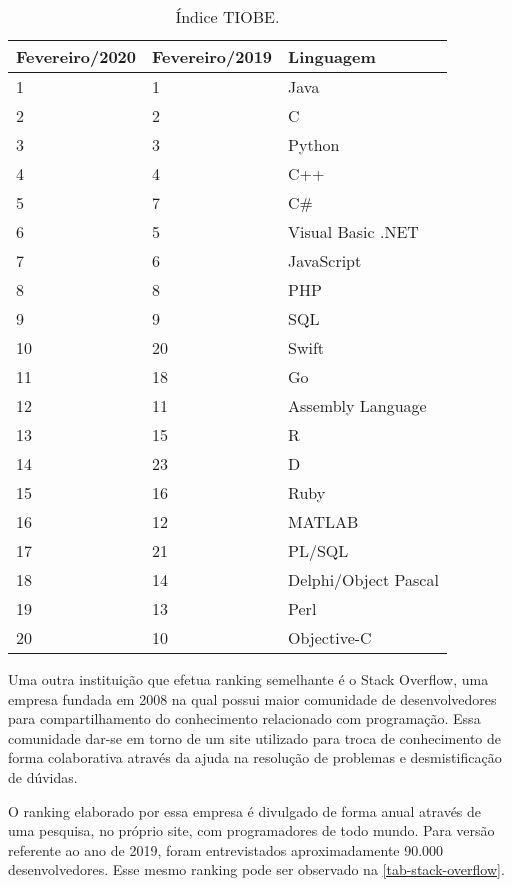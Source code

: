\begin{table}[htb]
\ABNTEXfontereduzida
\caption[Índice TIOBE]{Índice TIOBE.}
\label{tab-tiobe}
\begin{tabular}{p{2.6cm}|p{2.6cm}|p{4cm}}
   \textbf{Fevereiro/2020} & \textbf{Fevereiro/2019}  & \textbf{Linguagem}  \\
    \hline
    1 & 1 & Java \\
    \hline
    2 & 2 & C \\
    \hline
    3 & 3 & Python \\
    \hline
    4 & 4 & C++ \\
    \hline
    5 & 7 & C\# \\
    \hline
    6 & 5 & Visual Basic .NET \\
    \hline
    7 & 6 & JavaScript \\
    \hline
    8 & 8 & PHP \\
    \hline
    9 & 9 & SQL \\
    \hline
    10 & 20 & Swift \\
    \hline
    11 & 18 & Go \\
    \hline
    12 & 11 & Assembly Language \\
    \hline
    13 & 15 & R \\
    \hline
    14 & 23 & D \\
    \hline
    15 & 16 & Ruby \\
    \hline
    16 & 12 & MATLAB \\
    \hline
    17 & 21 & PL/SQL \\
    \hline
    18 & 14 & Delphi/Object Pascal \\
    \hline
    19 & 13 & Perl \\
    \hline
    20 & 10 & Objective-C \\
\end{tabular}
\end{table}

\newpage
Uma outra instituição que efetua ranking semelhante é o Stack Overflow, uma empresa fundada em 2008 na qual possui maior comunidade de desenvolvedores para compartilhamento do conhecimento relacionado com programação. Essa comunidade dar-se em torno de um site utilizado para troca de conhecimento de forma colaborativa através da ajuda na resolução de problemas e desmistificação de dúvidas.

O ranking elaborado por essa empresa é divulgado de forma anual através de uma pesquisa, no próprio site, com programadores de todo mundo. Para versão referente ao ano de 2019, foram entrevistados aproximadamente 90.000 desenvolvedores. Esse mesmo ranking pode ser observado na \autoref{tab-stack-overflow}.


